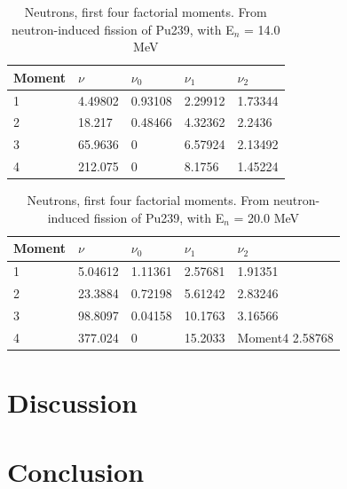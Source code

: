 \documentclass[]{article}
\begin{document}
\begin{table} [H]
	\centering
	\caption{Neutrons, first four factorial moments. From neutron-induced fission of Pu239, with E$_n$ = 14.0 MeV }
	\begin{tabularx}{\textwidth}{XXXXX} \hline
		\label{Pu239_n_moments_14}
		Moment & $\nu$ & $\nu_0$ & $\nu_1$ & $\nu_2$ \\ \hline
		1 & 4.49802 & 0.93108 & 2.29912 & 1.73344\\
		2 & 18.217 & 0.48466 & 4.32362 & 2.2436\\
		3 & 65.9636 & 0 & 6.57924 & 2.13492\\
		4 & 212.075 & 0 & 8.1756 & 1.45224\\ 
	\end{tabularx}
\end{table}

\begin{table} [H]
	\centering
	\caption{Neutrons, first four factorial moments. From neutron-induced fission of Pu239, with E$_n$ = 20.0 MeV }
	\begin{tabularx}{\textwidth}{XXXXX} \hline
		\label{Pu239_n_moments_20}
		Moment & $\nu$ & $\nu_0$ & $\nu_1$ & $\nu_2$ \\ \hline
		1 & 5.04612 & 1.11361 & 2.57681 & 1.91351\\
		2 & 23.3884 & 0.72198 & 5.61242 & 2.83246\\
		3 & 98.8097 & 0.04158 & 10.1763 & 3.16566\\
		4 & 377.024 & 0 & 15.2033 & Moment4 2.58768\\ 
	\end{tabularx}
\end{table}

\section{Discussion}

\section{Conclusion}

\vspace{3mm}
\end{document}
